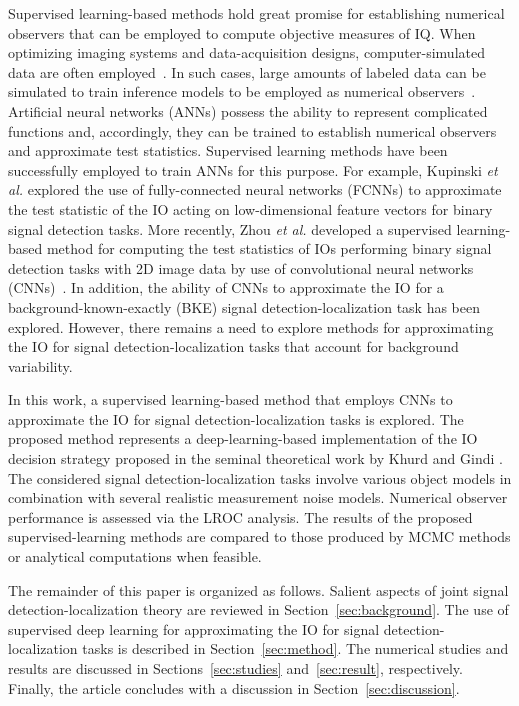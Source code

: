 \documentclass[journal]{IEEEtran}
\begin{document}
Supervised learning-based methods hold great promise for establishing numerical observers 
that can be employed to compute objective measures of IQ.
When optimizing imaging systems and data-acquisition designs,
computer-simulated data are often employed~\cite{kupinski2003ideal,barrett2013foundations}. 
In such cases, large amounts of labeled data can be simulated to train inference models to be employed as numerical observers~\cite{kupinski2001ideal, zhou2019approximating}.  
Artificial neural networks (ANNs) possess the ability to represent complicated functions and, accordingly,
they can be trained to establish numerical observers and approximate test statistics.
Supervised learning methods have been successfully employed to train ANNs for this purpose.
For example, Kupinski \emph{et al.} explored
the use of fully-connected neural networks (FCNNs) to approximate the test statistic of the IO acting on low-dimensional feature vectors for binary signal detection tasks\cite{kupinski2001ideal}.
More recently, Zhou \emph{et al.} developed a supervised learning-based method 
for computing the test statistics of IOs performing binary signal detection
tasks with 2D image data by use of convolutional neural networks (CNNs)~\cite{zhou2018learning, zhou2019approximating}.
In addition,  the ability of CNNs to approximate the IO for a background-known-exactly (BKE) signal detection-localization task has been explored\cite{zhou2019learning_lroc}.
{However,
there remains a need to explore methods for approximating the IO
for signal detection-localization tasks that account for background variability.}

In this work, a supervised learning-based method that employs CNNs to approximate the IO 
for signal detection-localization tasks is explored.
The proposed method represents a deep-learning-based implementation of the IO decision strategy proposed in the seminal theoretical work by Khurd and Gindi \cite{khurd2005decision}.
The considered signal detection-localization tasks involve various object models in combination with several realistic measurement noise models.
Numerical observer performance is assessed via the LROC analysis.
The results of the proposed supervised-learning methods are compared to those produced by MCMC methods or analytical computations when feasible.

The remainder of this paper is organized as follows. 
Salient aspects of joint signal detection-localization theory
 are reviewed in Section~\ref{sec:background}.
The use of supervised deep learning for approximating the IO for 
signal detection-localization tasks is described in Section~\ref{sec:method}.
The numerical studies and results are discussed in Sections~\ref{sec:studies} and~\ref{sec:result}, respectively. 
Finally, the article concludes with a discussion in Section~\ref{sec:discussion}.
 
\end{document}
